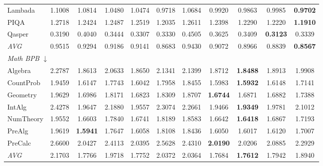 \begin{table}[htbp]
\begin{tabular}{lcccccccccc}
Lambada & 1.1008 & 1.0814 & 1.0480 & 1.0474 & 0.9718 & 1.0684 & 0.9920 & 0.9863 & 0.9985 & \textbf{0.9702} \\
PIQA & 1.2718 & 1.2424 & 1.2487 & 1.2519 & 1.2035 & 1.2611 & 1.2398 & 1.2290 & 1.2220 & \textbf{1.1910} \\
Qasper & 0.3190 & 0.4040 & 0.3444 & 0.3307 & 0.3330 & 0.4505 & 0.3625 & 0.3409 & \textbf{0.3123} & 0.3339 \\
\textit{AVG} & 0.9515 & 0.9294 & 0.9186 & 0.9141 & 0.8683 & 0.9430 & 0.9072 & 0.8966 & 0.8839 & \textbf{0.8567} \\
\midrule
\multicolumn{11}{l}{\textit{Math BPB} $\downarrow$} \\
Algebra & 2.2787 & 1.8613 & 2.0633 & 1.8650 & 2.1341 & 2.1399 & 1.8712 & \textbf{1.8488} & 1.8913 & 1.9908 \\
CountProb & 1.9459 & 1.6147 & 1.7743 & 1.6042 & 1.7958 & 1.8455 & 1.5983 & \textbf{1.5932} & 1.6148 & 1.7141 \\
Geometry & 1.9629 & 1.6986 & 1.8171 & 1.6823 & 1.8309 & 1.8707 & \textbf{1.6744} & 1.6871 & 1.6882 & 1.7388 \\
IntAlg & 2.4278 & 1.9647 & 2.1880 & 1.9557 & 2.3074 & 2.2661 & 1.9466 & \textbf{1.9349} & 1.9781 & 2.1012 \\
NumTheory & 1.9552 & 1.6603 & 1.7840 & 1.6741 & 1.8189 & 1.8583 & 1.6642 & \textbf{1.6418} & 1.6867 & 1.7193 \\
PreAlg & 1.9619 & \textbf{1.5941} & 1.7647 & 1.6058 & 1.8108 & 1.8436 & 1.6050 & 1.6017 & 1.6120 & 1.7007 \\
PreCalc & 2.6600 & 2.0427 & 2.4113 & 2.0395 & 2.5628 & 2.4310 & \textbf{2.0190} & 2.0206 & 2.0885 & 2.2929 \\
\textit{AVG} & 2.1703 & 1.7766 & 1.9718 & 1.7752 & 2.0372 & 2.0364 & 1.7684 & \textbf{1.7612} & 1.7942 & 1.8940 \\
\bottomrule
\end{tabular}
\end{table}


